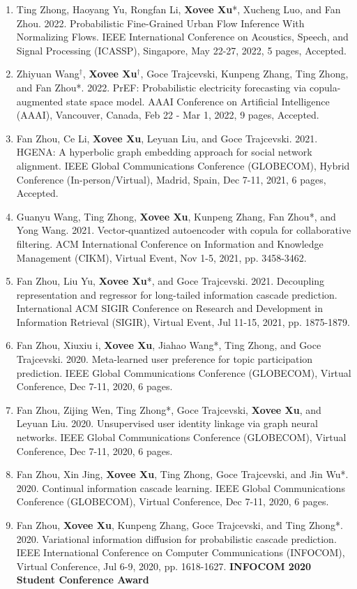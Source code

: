 \begin{enumerate}[resume]
    \item Ting Zhong, Haoyang Yu, Rongfan Li, \textbf{Xovee Xu}*, Xucheng Luo, and Fan Zhou. 2022. Probabilistic Fine-Grained Urban Flow Inference With Normalizing Flows. IEEE International Conference on Acoustics, Speech, and Signal Processing (ICASSP), Singapore, May 22-27, 2022, 5 pages, Accepted.
    \item Zhiyuan Wang$^\dagger$, \textbf{Xovee Xu}$^\dagger$, Goce Trajcevski, Kunpeng Zhang, Ting Zhong, and Fan Zhou*. 2022. PrEF: Probabilistic electricity forecasting via copula-augmented state space model. AAAI Conference on Artificial Intelligence (AAAI), Vancouver, Canada, Feb 22 - Mar 1, 2022, 9 pages, Accepted.
    \item Fan Zhou, Ce Li, \textbf{Xovee Xu}, Leyuan Liu, and Goce Trajcevski. 2021. HGENA: A hyperbolic graph embedding approach for social network alignment. IEEE Global Communications Conference (GLOBECOM), Hybrid Conference (In-person/Virtual), Madrid, Spain, Dec 7-11, 2021, 6 pages, Accepted. 
    \item Guanyu Wang, Ting Zhong, \textbf{Xovee Xu}, Kunpeng Zhang, Fan Zhou*, and Yong Wang. 2021. Vector-quantized autoencoder with copula for collaborative filtering. ACM International Conference on Information and Knowledge Management (CIKM), Virtual Event, Nov 1-5, 2021, pp. 3458-3462.
    \item Fan Zhou, Liu Yu, \textbf{Xovee Xu}*, and Goce Trajcevski. 2021. Decoupling representation and regressor for long-tailed information cascade prediction. International ACM SIGIR Conference on Research and Development in Information Retrieval (SIGIR), Virtual Event, Jul 11-15, 2021, pp. 1875-1879.
    \item Fan Zhou, Xiuxiu \swashQ i, \textbf{Xovee Xu}, Jiahao Wang*, Ting Zhong, and Goce Trajcevski. 2020. Meta-learned user preference for topic participation prediction. IEEE Global Communications Conference (GLOBECOM), Virtual Conference, Dec 7-11, 2020, 6 pages.
    \item Fan Zhou, Zijing Wen, Ting Zhong*, Goce Trajcevski, \textbf{Xovee Xu}, and Leyuan Liu. 2020. Unsupervised user identity linkage via graph neural networks. IEEE Global Communications Conference (GLOBECOM), Virtual Conference, Dec 7-11, 2020, 6 pages.
    \item Fan Zhou, Xin Jing, \textbf{Xovee Xu}, Ting Zhong, Goce Trajcevski, and Jin Wu*. 2020. Continual information cascade learning. IEEE Global Communications Conference (GLOBECOM), Virtual Conference, Dec 7-11, 2020, 6 pages.
    \item Fan Zhou, \textbf{Xovee Xu}, Kunpeng Zhang, Goce Trajcevski, and Ting Zhong*. 2020. Variational information diffusion for probabilistic cascade prediction. IEEE International Conference on Computer Communications (INFOCOM), Virtual Conference, Jul 6-9, 2020, pp. 1618-1627.
    \newline \textbf{\color{red}INFOCOM 2020 Student Conference Award}
\end{enumerate}


